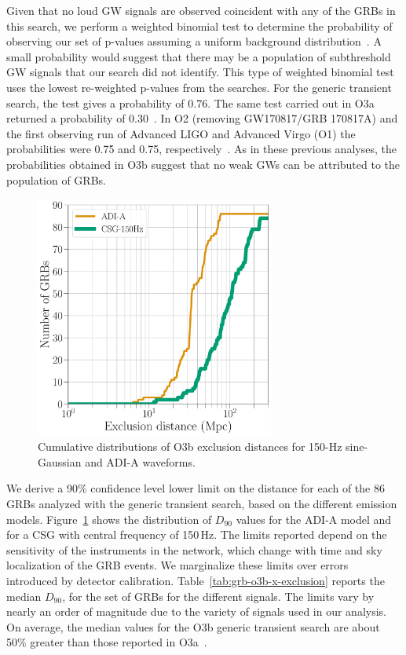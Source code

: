 Given that no loud \ac{GW} signals are observed coincident with any of the \acp{GRB} in this search, we perform a weighted binomial test to determine the probability of observing our set of p-values assuming a uniform background distribution~\citep{grb_s6}.
A small probability would suggest that there may be a population of subthreshold \ac{GW} signals that our search did not identify.
This type of weighted binomial test uses the lowest re-weighted p-values from the searches.
For the generic transient search, the test gives a probability of 0.76.
The same test carried out in O3a returned a probability of 0.30~\citep{grb_o3a}.
In \ac{O2} (removing GW170817/GRB 170817A) and the first observing run of Advanced LIGO and Advanced Virgo (O1) the probabilities were 0.75 and 0.75, respectively~\citep{grb_o2, grb_o1}.
As in these previous analyses, the probabilities obtained in O3b suggest that no weak GWs can be attributed to the population of GRBs.

\begin{figure}[h]
  \centering
  \includegraphics[width=0.7\textwidth]{figures/grb/o3b-x-exclusion.pdf}
  \caption{Cumulative distributions of O3b exclusion distances for 150-Hz sine-Gaussian and ADI-A waveforms.}
  \label{fig:grb-o3b-x-exclusion}
\end{figure}

We derive a 90\% confidence level lower limit on the distance for each of the 86 GRBs analyzed with the generic transient search, based on the different emission models.
Figure~\ref{fig:grb-o3b-x-exclusion} shows the distribution of $D_{90}$ values for the ADI-A model and for a CSG with central frequency of 150\,Hz.
The limits reported depend on the sensitivity of the instruments in the network, which change with time and sky localization of the GRB events.
We marginalize these limits over errors introduced by detector calibration.
Table~\ref{tab:grb-o3b-x-exclusion} reports the median $D_{90}$, for the set of GRBs for the different signals.
The limits vary by nearly an order of magnitude due to the variety of signals used in our analysis.
On average, the median values for the O3b generic transient search are about 50\% greater than those reported in O3a~\citep{grb_o3a}.

